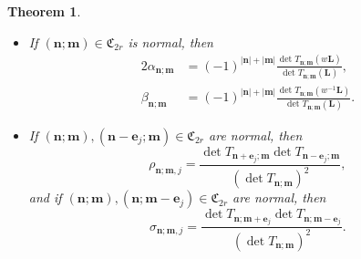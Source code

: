 \documentclass[reqno,centertags,11pt,draft]{amsart}
\newtheorem{thm}{Theorem}[section]
\begin{document}
    \begin{thm}
    \noindent\hfill
        \begin{itemize}
            \item[(i)] If $(\bm{n};\bm{m})\in\mathfrak{C}_{2r}$ is normal, then
            \begin{alignat}{2}
                \alpha_{\bm{n};\bm{m}} &= (-1)^{|\bm{n}|+|\bm{m}|} \frac{\det T_{\bm{n};\bm{m}}(w\bm{L})}{\det T_{\bm{n};\bm{m}}(\bm{L})},
                \\
                \beta_{\bm{n};\bm{m}} &=(-1)^{|\bm{n}|+|\bm{m}|} \frac{\det T_{\bm{n};\bm{m}}(w^{-1}\bm{L})}{\det T_{\bm{n};\bm{m}}(\bm{L})}.
            \end{alignat}

            \item[(ii)] If $(\bm{n};\bm{m}),(\bm{n}-\bm{e}_j;\bm{m})\in\mathfrak{C}_{2r}$ are normal, then
            \begin{equation}
                \rho_{\bm{n};\bm{m},j} =  \frac{\det T_{\bm{n}+\bm{e}_j;\bm{m}} \det T_{\bm{n}-\bm{e}_j;\bm{m}} }{(\det T_{\bm{n};\bm{m}})^2} ,
            \end{equation}
            and if $(\bm{n};\bm{m}),(\bm{n};\bm{m}-\bm{e}_j)\in\mathfrak{C}_{2r}$ are normal, then
            \begin{equation}
                \sigma_{\bm{n};\bm{m},j} = \frac{\det T_{\bm{n};\bm{m}+\bm{e}_j} \det T_{\bm{n};\bm{m}-\bm{e}_j} }{(\det T_{\bm{n};\bm{m}})^2}.
            \end{equation}


\end{itemize}
\end{thm}
\end{document}
